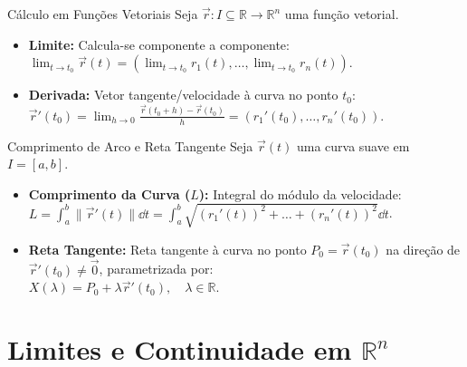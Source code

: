 \documentclass[11pt,a4paper]{article}
\newcommand{\R}{\mathbb{R}}
\begin{document}
\begin{definitionbox}[before=\vspace{2pt}, after=\vspace{2pt}, top=4pt, bottom=4pt]{Cálculo em Funções Vetoriais}
  Seja $\vec{r} : I \subseteq \R \to \R^n$ uma função vetorial.
  \begin{itemize}[noitemsep, topsep=1pt, parsep=0pt]
    \item \textbf{Limite:} Calcula-se componente a componente: \\
      $\lim_{t \to t_0} \vec{r}(t) = \left( \lim_{t \to t_0} r_1(t), \dots, \lim_{t \to t_0} r_n(t) \right)$.
    \item \textbf{Derivada:} Vetor tangente/velocidade à curva no ponto $t_0$: \\
      $\vec{r}'(t_0) = \lim_{h \to 0} \frac{\vec{r}(t_0+h) - \vec{r}(t_0)}{h} = \left( r_1'(t_0), \dots, r_n'(t_0) \right)$.
  \end{itemize}
\end{definitionbox}

\noindent\begin{theorembox}[before=\vspace{2pt}, after=\vspace{2pt}, top=4pt, bottom=4pt]{Comprimento de Arco e Reta Tangente}
  Seja $\vec{r}(t)$ uma curva suave em $I = [a, b]$.
  \begin{itemize}[noitemsep, topsep=1pt, parsep=0pt]
    \item \textbf{Comprimento da Curva ($L$):} Integral do módulo da velocidade: \\
      $L = \int_a^b \|\vec{r}'(t)\| \dd t = \int_a^b \sqrt{(r_1'(t))^2 + \dots + (r_n'(t))^2} \dd t$.
    \item \textbf{Reta Tangente:} Reta tangente à curva no ponto $P_0 = \vec{r}(t_0)$ na direção de $\vec{r}'(t_0) \neq \vec{0}$, parametrizada por: \\
      $X(\lambda) = P_0 + \lambda \vec{r}'(t_0), \quad \lambda \in \R$.
  \end{itemize}
\end{theorembox}

\newpage

\section{Limites e Continuidade em \texorpdfstring{$\R^n$}{R\textasciicircum n}}
\label{chap:limites_continuidade}
\end{document}
